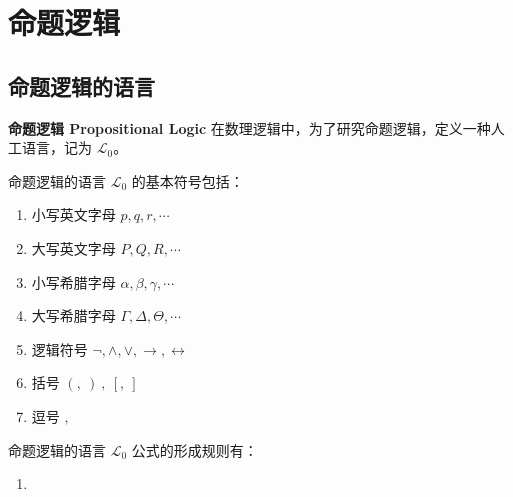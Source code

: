 \section{命题逻辑}

\subsection{命题逻辑的语言}

\textbf{命题逻辑 Propositional Logic} 在数理逻辑中，为了研究命题逻辑，定义一种人工语言，记为 $\mathcal{L}_0$。

\begin{definition}[基本符号]
    命题逻辑的语言 $\mathcal{L}_0$ 的基本符号包括：
    \begin{enumerate}
        \item 小写英文字母 $p,q,r,\cdots$
        \item 大写英文字母 $P,Q,R,\cdots$
        \item 小写希腊字母 $\alpha,\beta,\gamma,\cdots$
        \item 大写希腊字母 $\Gamma,\Delta,\Theta,\cdots$
        \item 逻辑符号 $\neg, \wedge, \vee, \rightarrow, \leftrightarrow$
        \item 括号 $(,\ )\ ,\ [,\ ]$
        \item 逗号 $,$
    \end{enumerate}
\end{definition}

\begin{definition}[语法规则]
    命题逻辑的语言 $\mathcal{L}_0$ 公式的形成规则有：
    \begin{enumerate}
        \item 
    \end{enumerate}
\end{definition}

\newpage